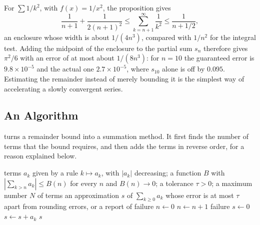 For $\sum1/k^2$, with $f(x)=1/x^2$, the proposition gives
\[
\frac1{n+1}+\frac1{2(n+1)^2}\le\sum_{k=n+1}^\infty\frac1{k^2}\le\frac1{n+1/2},
\]
an enclosure whose width is about $1/(4n^3)$, compared with $1/n^2$ for the integral test. Adding the midpoint of the enclosure to the partial sum $s_n$ therefore gives $\pi^2/6$ with an error of at most about $1/(8n^3)$: for $n=10$ the guaranteed error is $9.8\times10^{-5}$ and the actual one $2.7\times10^{-5}$, where $s_{10}$ alone is off by $0.095$. Estimating the remainder instead of merely bounding it is the simplest way of accelerating a slowly convergent series.

\subsection{An Algorithm}

 turns a remainder bound into a summation method. It first finds the number of terms that the bound requires, and then adds the terms in reverse order, for a reason explained below.

\begin{algorithm}
\begin{algorithmic}[1]
\Require terms $a_k$ given by a rule $k\mapsto a_k$, with $|a_k|$ decreasing; a function $B$ with $|\sum_{k>n}a_k|\le B(n)$ for every $n$ and $B(n)\to0$; a tolerance $\tau>0$; a maximum number $N$ of terms
\Ensure an approximation $s$ of $\sum_{k\ge0}a_k$ whose error is at most $\tau$ apart from rounding errors, or a report of failure
\State $n\gets0$
  \State $n\gets n+1$
   \Return failure 
  \EndIf
\EndWhile
\State $s\gets0$
 
  \State $s\gets s+a_k$
\EndFor
\State \Return $s$
\end{algorithmic}
\caption{Summing a series to a prescribed accuracy with a remainder bound. The bound $B$ is supplied by the user from \cref{prop:tail-bounds,prop:convex-tail} or from a closed form; the method is only as reliable as $B$.}
\label{alg:sum-series}
\end{algorithm}

